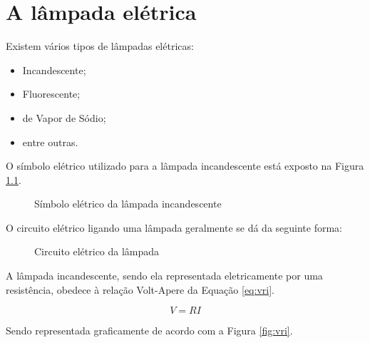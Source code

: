 \chapter{A lâmpada elétrica}
\label{chap:alampada}

Existem vários tipos de lâmpadas elétricas:
\begin{itemize}
\item Incandescente;
\item Fluorescente;
\item de Vapor de Sódio;
\item entre outras. %
\end{itemize}

O símbolo elétrico utilizado para a lâmpada incandescente está
exposto na Figura \ref{fig:simbolo_lampada}.

\begin{figure}[!htb]
\centering
{}
\caption{Símbolo elétrico da lâmpada incandescente}
\label{fig:simbolo_lampada}
\end{figure}

O circuito elétrico ligando uma lâmpada geralmente se dá da
seguinte forma:

\begin{figure}[!htb]
\centering
{}
\caption{Circuito elétrico da lâmpada}
\label{fig:circuito_lampada}
\end{figure}

A lâmpada incandescente, sendo ela representada eletricamente por
uma resistência, obedece à relação Volt-Apere da Equação \ref{eq:vri}.

\begin{equation}
\label{eq:vri}
V=R I
\end{equation}

Sendo representada graficamente de acordo com a Figura \ref{fig:vri}.


